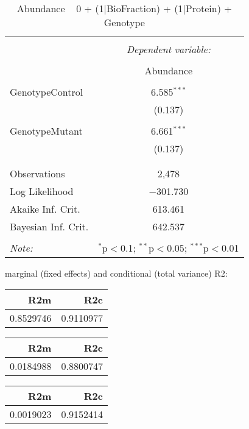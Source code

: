 \documentclass[11pt]{report}
\begin{document}
\begin{table}[!htbp] \centering 
  \caption{Abundance ~ 0 + (1|BioFraction) + (1|Protein) + Genotype} 
  \label{} 
\begin{tabular}{@{\extracolsep{5pt}}lc} 
\\[-1.8ex]\hline 
\hline \\[-1.8ex] 
 & \multicolumn{1}{c}{\textit{Dependent variable:}} \\ 
\cline{2-2} 
\\[-1.8ex] & Abundance \\ 
\hline \\[-1.8ex] 
 GenotypeControl & 6.585$^{***}$ \\ 
  & (0.137) \\ 
  & \\ 
 GenotypeMutant & 6.661$^{***}$ \\ 
  & (0.137) \\ 
  & \\ 
\hline \\[-1.8ex] 
Observations & 2,478 \\ 
Log Likelihood & $-$301.730 \\ 
Akaike Inf. Crit. & 613.461 \\ 
Bayesian Inf. Crit. & 642.537 \\ 
\hline 
\hline \\[-1.8ex] 
\textit{Note:}  & \multicolumn{1}{r}{$^{*}$p$<$0.1; $^{**}$p$<$0.05; $^{***}$p$<$0.01} \\ 
\end{tabular} 
\end{table} 
marginal (fixed effects) and conditional (total variance) R2:

\begin{tabular}{r|r}
\hline
R2m & R2c\\
\hline
0.8529746 & 0.9110977\\
\hline
\end{tabular}

\begin{tabular}{r|r}
\hline
R2m & R2c\\
\hline
0.0184988 & 0.8800747\\
\hline
\end{tabular}

\begin{tabular}{r|r}
\hline
R2m & R2c\\
\hline
0.0019023 & 0.9152414\\
\hline
\end{tabular}
\end{document}
